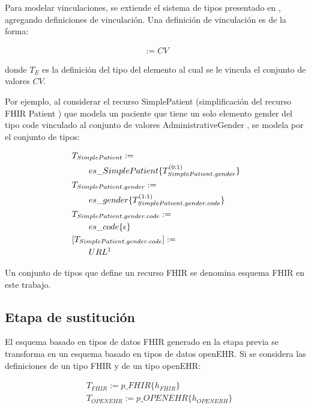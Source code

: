 Para modelar vinculaciones, se extiende el sistema de tipos presentado en \cite{Maldonado09}, agregando definiciones de vinculación. Una definición de vinculación es de la forma:

\begin{align*}
[T_E] := CV
\end{align*}

\noindent
donde \(T_E\) es la definición del tipo del elemento al cual se le vincula el conjunto de valores \(CV\).

Por ejemplo, al considerar el recurso SimplePatient (simplificación del recurso FHIR Patient \cite{FHIRPatient}) que modela un paciente que tiene un solo elemento gender del tipo code \cite{FHIRDataTypes} vinculado al conjunto de valores AdministrativeGender \cite{FHIRAdministrativeGender}, se modela por el conjunto de tipos:

\begin{align*}
&T_{SimplePatient}:= \\
&\qquad es\_SimplePatient\{T_{SimplePatient.gender}^{(0:1)}\} \\
&T_{SimplePatient.gender}:= \\
&\qquad es\_gender\{T_{SimplePatient.gender.code}^{(1:1)}\} \\
&T_{SimplePatient.gender.code}:= \\
&\qquad es\_code\{\epsilon\} \\
&[T_{SimplePatient.gender.code}] := \\
&\qquad URL \footnotemark[1] \\
\end{align*}

Un conjunto de tipos que define un recurso FHIR se denomina esquema FHIR en este trabajo.

\subsection{Etapa de sustitución}

El esquema basado en tipos de datos FHIR generado en la etapa previa se transforma en un esquema basado en tipos de datos openEHR. Si se considera las definiciones de un tipo FHIR y de un tipo openEHR:

\begin{align*}
&T_{FHIR}:=p\_FHIR\{h_{FHIR}\} \\
&T_{OPENEHR}:=p\_OPENEHR\{h_{OPENERH}\}
\end{align*}

